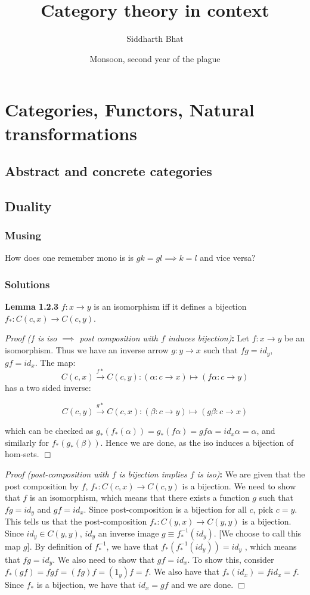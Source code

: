 \documentclass[11pt]{book}
\title{Category theory in context}
\author{Siddharth Bhat}
\date{Monsoon, second year of the plague}
\def\qed{$\Box$}
\newcommand{\beginproof}[1][]{\emph{Proof #1}\textbf{:} }
\newcommand{\question}[1]{\textbf{#1}}
\begin{document}
\maketitle
\tableofcontents
\chapter{Categories, Functors, Natural transformations}
\section{Abstract and concrete categories}
\section{Duality}

\subsection{Musing}
How does one remember mono is is $gk = gl \implies k = l$ and vice versa?

\subsection{Solutions}
\question{Lemma 1.2.3} $f: x \to y$ is an isomorphism iff it defines a bijection $f_*: C(c, x) \to C(c, y)$.


\beginproof[($f$ is iso $\implies$ post composition with $f$ induces bijection)]
Let $f: x \to y$ be an isomorphism. Thus we have an inverse arrow $g: y \to x$ such that $fg = id_y$, $gf = id_x$.
The map: $$C(c, x) \xrightarrow{f*} C(c, y): (\alpha: c \to x) \mapsto (f\alpha: c \to y)$$
has a two sided inverse:

$$
C(c, y) \xrightarrow{g*} C(c, x): (\beta: c \to y) \mapsto (g\beta: c \to x)
$$

which can be checked as $g_*(f_*(\alpha)) = g_*(f\alpha) = gf\alpha = id_x\alpha = \alpha$, and similarly for $f_*(g_*(\beta))$.
Hence we are done, as the iso induces a bijection of hom-sets.
\qed


\beginproof[(post-composition with $f$ is bijection implies $f$ is iso)]
We are given that the post composition by $f$, $f_*: C(c, x) \rightarrow C(c, y)$ is a bijection.
We need to show that $f$ is an isomorphism, which means that there exists a function $g$ such that $fg = id_y$ and $gf = id_x$.
Since post-composition is a bijection for all $c$, pick $c = y$. This tells us that the post-composition 
$f_*: C(y, x) \rightarrow C(y, y)$ is a bijection. Since $id_y \in C(y, y)$, $id_y$ an inverse image $g \equiv f_*^{-1}(id_y)$. 
[We choose to call this map $g$]. By definition of $f_*^{-1}$, we have that $f_*(f_*^{-1}(id_y)) = id_y$ , which means
that $fg = id_y$. We also need to show that $gf = id_x$. To show this, consider $f_*(gf) = fgf = (fg)f = (1_y)f = f$.
We also have that $f_*(id_x) = f id_x = f$. Since $f_*$ is a bijection, we have that $id_x = gf$ and we are done.  \qed
\end{document}
